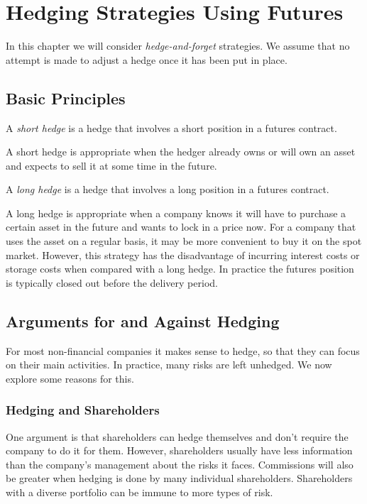 \section{Hedging Strategies Using Futures}

In this chapter we will consider \emph{hedge-and-forget} strategies. We assume that no attempt is made to adjust a hedge once it has been put in place.

\subsection{Basic Principles}
\bigskip

\begin{definition}
    A \emph{short hedge} is a hedge that involves a short position in a futures contract.
\end{definition}

A short hedge is appropriate when the hedger already owns or will own an asset
and expects to sell it at some time in the future.

\begin{definition}
    A \emph{long hedge} is a hedge that involves a long position in a futures contract.
\end{definition}

A long hedge is appropriate when a company knows it will have to purchase a
certain asset in the future and wants to lock in a price now. For a company that uses the asset on a regular basis, it may be more convenient to buy it on the spot market. However, this strategy has the disadvantage of incurring interest costs or storage costs when compared with a long hedge. In practice the futures position is typically closed out before the delivery period.

\subsection{Arguments for and Against Hedging}

For most non-financial companies it makes sense to hedge, so that they can focus on their main activities. In practice, many risks are left unhedged. We now explore some reasons for this.

\subsubsection*{Hedging and Shareholders}

One argument is that shareholders can hedge themselves and don't require the company to do it for them. However, shareholders usually have less information than the company's management about the risks it faces. Commissions will also be greater when hedging is done by many individual shareholders. Shareholders with a diverse portfolio can be immune to more types of risk.

